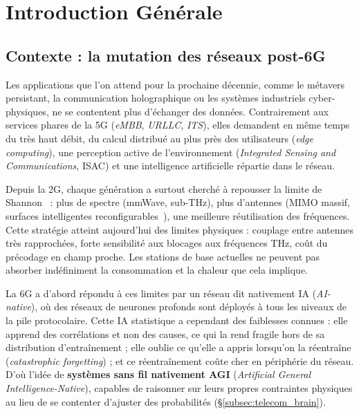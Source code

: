 \documentclass[12pt,a4paper,titlepage]{article}
\begin{document}
\newpage
\tableofcontents
\newpage

\section{Introduction Générale}

\subsection{Contexte : la mutation des réseaux post-6G}

Les applications que l'on attend pour la prochaine décennie, comme le métavers persistant, la communication holographique ou les systèmes industriels cyber-physiques, ne se contentent plus d'échanger des données. Contrairement aux services phares de la 5G (\textit{eMBB}, \textit{URLLC}, \textit{ITS}), elles demandent en même temps du très haut débit, du calcul distribué au plus près des utilisateurs (\textit{edge computing}), une perception active de l'environnement (\textit{Integrated Sensing and Communications}, ISAC) et une intelligence artificielle répartie dans le réseau.

Depuis la 2G, chaque génération a surtout cherché à repousser la limite de Shannon~\cite{shannon1948} : plus de spectre (mmWave, sub-THz), plus d'antennes (MIMO massif, surfaces intelligentes reconfigurables~\cite{cell_free_mimo}), une meilleure réutilisation des fréquences. Cette stratégie atteint aujourd'hui des limites physiques : couplage entre antennes très rapprochées, forte sensibilité aux blocages aux fréquences THz, coût du précodage en champ proche. Les stations de base actuelles ne peuvent pas absorber indéfiniment la consommation et la chaleur que cela implique.

La 6G a d'abord répondu à ces limites par un réseau dit nativement IA (\textit{AI-native}), où des réseaux de neurones profonds sont déployés à tous les niveaux de la pile protocolaire. Cette IA statistique a cependant des faiblesses connues : elle apprend des corrélations et non des causes, ce qui la rend fragile hors de sa distribution d'entraînement ; elle oublie ce qu'elle a appris lorsqu'on la réentraîne (\textit{catastrophic forgetting}) ; et ce réentraînement coûte cher en périphérie du réseau. D'où l'idée de \textbf{systèmes sans fil nativement AGI} (\textit{Artificial General Intelligence-Native}), capables de raisonner sur leurs propres contraintes physiques au lieu de se contenter d'ajuster des probabilités (\S\ref{subsec:telecom_brain}).
\end{document}

